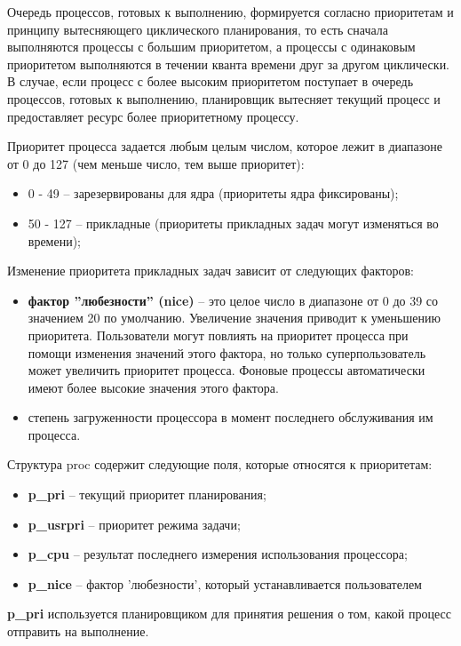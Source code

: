 Очередь процессов, готовых к выполнению, формируется согласно приоритетам и принципу вытесняющего циклического планирования, то есть
сначала выполняются процессы с большим приоритетом, а процессы с одинаковым приоритетом выполняются в течении кванта времени друг за другом циклически. 
В случае, если процесс с более высоким приоритетом поступает в очередь процессов, готовых к выполнению, планировщик вытесняет текущий процесс и предоставляет ресурс более приоритетному процессу.

Приоритет процесса задается любым целым числом, которое лежит в
диапазоне от 0 до 127 (чем меньше число, тем выше приоритет):
\begin{itemize}
	\item 0 - 49 – зарезервированы для ядра (приоритеты ядра фиксированы);
	\item 50 - 127 – прикладные (приоритеты прикладных задач могут изменяться во времени);
\end{itemize}

Изменение приоритета прикладных задач зависит от следующих факторов:
\begin{itemize}
	\item \textbf{фактор ”любезности” (nice)} -- это целое число в диапазоне от 0 до 39 со значением 20 по умолчанию. 
	Увеличение значения приводит к уменьшению приоритета. 
	Пользователи могут повлиять на приоритет процесса при помощи изменения значений этого фактора, но
	только суперпользователь может увеличить приоритет процесса. 
	Фоновые процессы автоматически имеют более высокие значения этого фактора.
	\item степень загруженности процессора в момент последнего обслуживания им процесса.
\end{itemize}

Структура proc содержит следующие поля, которые относятся к приоритетам:

\begin{itemize}
	\item \textbf{p\_pri} -- текущий приоритет планирования;
	\item \textbf{p\_usrpri} -- приоритет режима задачи;
	\item \textbf{p\_cpu} -- результат последнего измерения использования процессора;
	\item \textbf{p\_nice} -- фактор ’любезности’, который устанавливается пользователем
\end{itemize}

\textbf{p\_pri} используется планировщиком для принятия решения о том, какой процесс отправить на выполнение.

